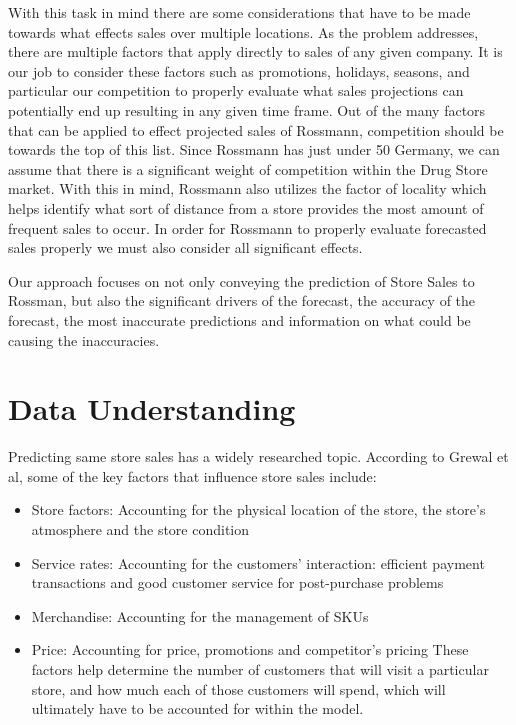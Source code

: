 \documentclass[DIV=calc, paper=a4, fontsize=11pt]{scrartcl}	 %
\begin{document}
With this task in mind there are some considerations that have to be made towards 
what effects sales over multiple locations. As the problem addresses, there are multiple factors 
that apply directly to sales of any given company. It is our job to consider these factors such as 
promotions, holidays, seasons, and particular our competition to properly evaluate what sales 
projections can potentially end up resulting in any given time frame. Out of the many factors 
that can be applied to effect projected sales of Rossmann, competition should be towards the 
top of this list. Since Rossmann has just under 50%
Germany, we can assume that there is a significant weight of competition within the Drug Store 
market.  With this in mind, Rossmann also utilizes the factor of locality which helps identify 
what sort of distance from a store provides the most amount of frequent sales to occur. In 
order for Rossmann to properly evaluate forecasted sales properly we must also consider all 
significant effects.

Our approach focuses on not only conveying the prediction of Store Sales
to Rossman, but also the significant drivers of the forecast, the accuracy of the 
forecast, the most inaccurate predictions and information on what could be 
causing the inaccuracies.

\section*{Data Understanding}

Predicting same store sales has a widely researched topic. According to 
Grewal et al, some of the key factors that influence store sales include:
\begin{itemize}
\item Store factors: Accounting for the physical location of the store, the 
store’s atmosphere and the store condition
\item Service rates: Accounting for the customers’ interaction: efficient 
payment transactions and good customer service for post-purchase 
problems
\item Merchandise: Accounting for the management of SKUs
\item Price: Accounting for price, promotions and competitor’s pricing 
These factors help determine the number of customers that will visit a 
particular store, and how much each of those customers will spend, which will 
ultimately have to be accounted for within the model.\cite{Grewal}
\end{itemize}
\end{document}
